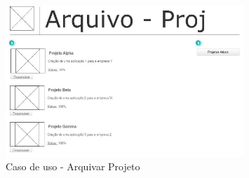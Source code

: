 \begin{figure}[H]
  \center
  \includegraphics[width=0.8\textwidth]{figuras/Prototipo9}
  \caption{Caso de uso - Arquivar Projeto}
  \label{fig: uc-arquivar-projeto}
\end{figure}


